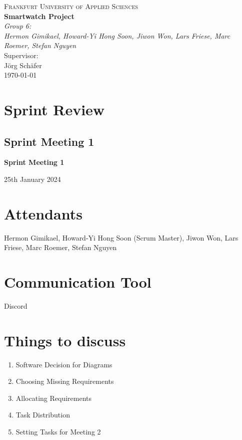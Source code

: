 \documentclass{article}
\begin{document}
\begin{titlepage}
    \centering
    \vspace*{0cm}
    {\scshape\Large Frankfurt University of Applied Sciences}\\[3cm]
    {\huge\bfseries Smartwatch Project}\\[8cm]
    {\Large\itshape Group 6:}\\
    {\Large\itshape Hermon Gimikael, Howard-Yi Hong Soon, Jiwon Won, Lars Friese, Marc Roemer, Stefan Nguyen}\\[4cm]
    Supervisor:\\
    Jörg Schäfer\\[3cm]
    {\large \today}
\end{titlepage}

\tableofcontents
\newpage

\section{Sprint Review}
\subsection{Sprint Meeting 1}
\begin{center}
    {\Large \textbf{Sprint Meeting 1}}
    
    \vspace{0.5cm}
    
    {\large 25th January 2024}
\end{center}

\section*{Attendants}
Hermon Gimikael, Howard-Yi Hong Soon (Scrum Master), Jiwon Won, Lars Friese, Marc Roemer, Stefan Nguyen

\section*{Communication Tool}
Discord

\section*{Things to discuss}
\begin{enumerate}
    \item Software Decision for Diagrams
    \item Choosing Missing Requirements
    \item Allocating Requirements
    \item Task Distribution
    \item Setting Tasks for Meeting 2
\end{enumerate}
\end{document}
